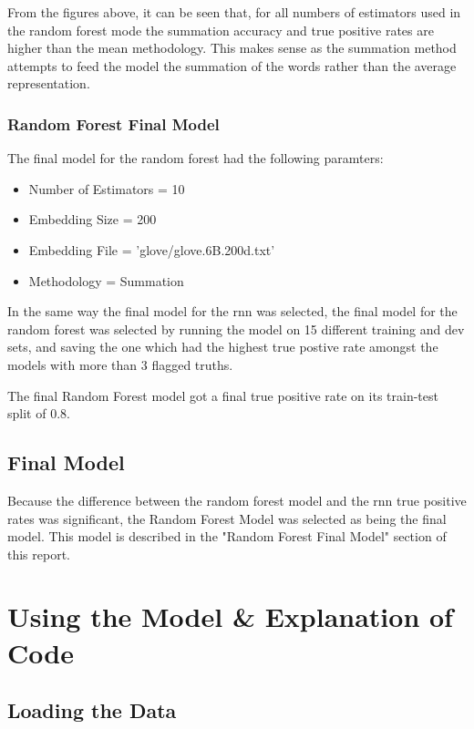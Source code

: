 \documentclass[twoside,twocolumn]{article}
\begin{document}
From the figures above, it can be seen that, for all numbers of estimators used in the
random forest mode the summation accuracy and true positive rates are higher than the mean
methodology. This makes sense as the summation method attempts to feed the model the summation
of the words rather than the average representation.

\subsubsection{Random Forest Final Model}

The final model for the random forest had the following paramters:

\begin{itemize}
\item Number of Estimators = 10
\item Embedding Size = 200
\item Embedding File = 'glove/glove.6B.200d.txt'
\item Methodology = Summation 
\end{itemize}

In the same way the final model for the rnn was selected, the final model for the random forest was
selected by running the model on 15 different training and dev sets, and saving the one which had the
highest true postive rate amongst the models with more than 3 flagged truths.

The final Random Forest model got a final true positive rate on its train-test split of 0.8. 

\subsection{Final Model}

Because the difference between the random forest model and the rnn true positive rates was significant,
the Random Forest Model was selected as being the final model. This model is described in the "Random Forest Final Model"
section of this report.


\section{Using the Model & Explanation of Code}

\subsection{Loading the Data}
\end{document}
